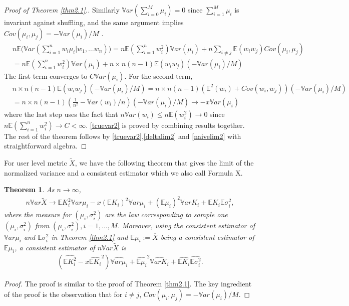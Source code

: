 \documentclass[10pt]{article}
\newcommand{\wX}{\widetilde{X}}
\newcommand{\wht}{\widehat}
\newcommand{\var}{\ensuremath{\mathbb Var}}
\newcommand{\bbe}{\mathbb{E}}
\newcommand{\xbar}{\overline{X}}
\newtheorem{thm}{Theorem}
\begin{document}
\begin{proof}[Proof of Theorem \ref{thm2.1}.]
Similarly $\var(\sum_{i=0}^M \mu_i) = 0$ since $\sum_{i=1}^M \mu_i$ is invariant against shuffling, and the same argument implies $Cov(\mu_i,\mu_j) = - \var(\mu_i)/M$ . 
\begin{align*}
&n\bbe \bigl(\var(\sum_{i=1}^n w_i \mu_i| w_1,\dots w_n) \bigr)= n\bbe(\sum_{i=1}^nw_i^2)\var(\mu_i) + n \sum_{i\neq j} \bbe(w_i w_j) Cov(\mu_i,\mu_j)\\
&= n\bbe(\sum_{i=1}^nw_i^2)\var(\mu_i) + n\times n(n-1)\bbe(w_i w_j) (-\var(\mu_i)/M) 
\end{align*}
The first term converges to $C \var(\mu_i)$. For the second term, 
\begin{align*}
&n\times n(n-1)\bbe(w_i w_j) (-\var(\mu_i)/M) = n\times n(n-1)(\bbe^2(w_i)+Cov(w_i,w_j)) (-\var(\mu_i)/M)\\
&= n\times n(n-1)(\frac{1}{n^2}-\var(w_i)/n)(-\var(\mu_i)/M)\to - x \var (\mu_i)
\end{align*}
where the last step uses the fact that $n\var(w_i)\le n\bbe(w_i^2)\to 0$ since $n\bbe(\sum_{i=1}^nw_i^2)\to C<\infty$.  
\eqref{truevar2} is proved by combining results together. The rest of the theorem follows by \eqref{truevar2},\eqref{deltalim2} and \eqref{naivelim2} with straightforward algebra.
\end{proof}

For user level metric $\wX$, we have the following theorem that gives the limit of the normalized variance and a consistent estimator which we also call Formula X. 
\begin{thm}\label{thm2.2}
As $n\to \infty$, 
\begin{align*}
n\var \wX \to \bbe K_i^2 \var \mu_i- x (\bbe K_i)^2 \var \mu_i+ (\bbe \mu_i)^2 \var K_i + \bbe K_i \bbe \sigma_i^2,
\end{align*} 
where the measure for $(\mu_i,\sigma_i^2)$ are the law corresponding to sample one $(\mu_i,\sigma_i^2)$ from $(\mu_i,\sigma_i^2), i=1,\dots,M$.
Moreover, using the consistent estimator of $\var \mu_i$ and $\bbe \sigma_i^2$ in Theorem \ref{thm2.1} and $\wht{\bbe \mu_i}:= \xbar$ being a consistent estimator of $\bbe \mu_i$, a consistent estimator of $n\var \wX$ is
\begin{align}
(\wht{\bbe K_i^2}- x \wht{\bbe K_i}^2) \wht{\var \mu_i} + \wht{\bbe \mu_i}^2 \wht{\var K_i} + \wht{\bbe K_i} \wht{\bbe \sigma_i^2} . \tag{Formula X}
\end{align}
\end{thm}

\begin{proof}
The proof is similar to the proof of Theorem \ref{thm2.1}. The key ingredient of the proof is the observation that for $i\neq j$, $Cov(\mu_i,\mu_j) = - \var(\mu_i)/M$.
\end{proof}
\end{document}
